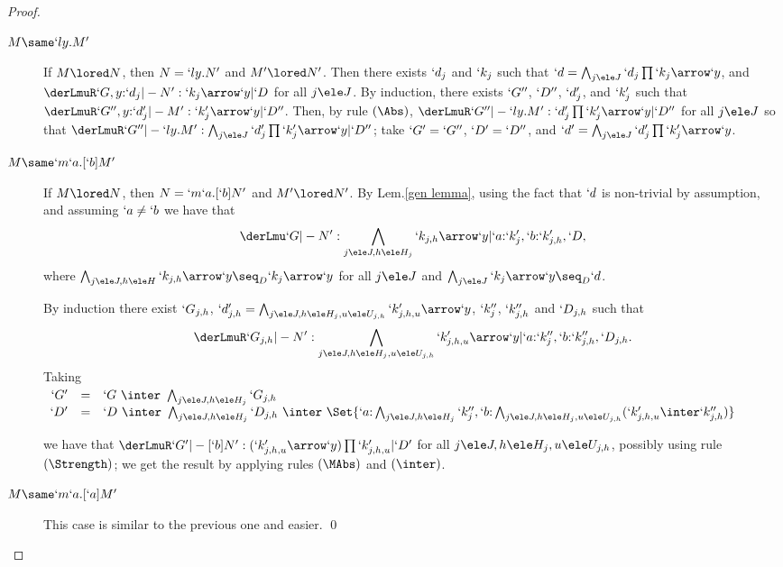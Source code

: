 \documentclass{lmcs}
\begin{document}
\begin{proof}
\begin{description}
 \item [$ M \same `ly.M' $] 
If $M \lored N$, then $N = `ly.N'$ and $M' \lored N'$.
Then there exists $`d_j$ and $`k_j$ such that $`d = \bigwedge_{j\ele J} `d_j\prod `k_j\arrow `y$, and $\derLmuR `G,y{:}`d_j |- N' : `k_j\arrow `y | `D $ for all $j\ele J$.
By induction, there exists $`G''$, $`D''$, $`d'_j$, and $`k'_j$ such that $\derLmuR `G'',y{:}`d'_j |- M' : `k'_j\arrow `y | `D'' $.
Then, by rule $(\Abs)$, $\derLmuR `G'' |- `ly.M' : `d'_j\prod `k'_j\arrow `y | `D'' $ for all $j\ele J$ so that $\derLmuR `G'' |- `ly.M' : \bigwedge_{j\ele J}`d'_j\prod `k'_j\arrow `y | `D'' $;  take $`G' = `G''$, $`D' = `D''$, and $`d' = \bigwedge_{j\ele J}`d'_j\prod `k'_j\arrow `y$.


 \item [{$M \same `m`a.[`b]M'$}]
 If $M \lored N$, then $N = `m`a.[`b]N'$ and $M' \lored N'$. By Lem.\skp\ref{gen lemma}, using the fact that $`d$ is non-trivial by assumption, and assuming $`a\neq`b$ we have that 
 \[
\derLmu `G |- N' : \bigwedge_{j\ele J, h\ele H_j}`k_{j,h}\arrow `y | `a{:}`k'_j, `b{:}`k'_{j,h},`D ,
 \]
where $ \bigwedge_{j\ele J, h\ele H} `k_{j,h}\arrow `y \seq_D `k_j\arrow`y$ for all $j\ele J$ and $\bigwedge _{j\ele J}`k_j\arrow`y \seq_D `d$.
 
By induction there exist $`G_{j,h}$, $`d'_{j,h} = \bigwedge_{j\ele J, h\ele H_j, u\ele U_{j,h}} `k'_{j,h,u}\arrow`y$, $`k''_j$, $`k''_{j,h}$ and $`D_{j,h}$ such that 
 \[
\derLmuR `G_{j,h} |- N' : {\bigwedge_{j\ele J, h\ele H_j, u\ele U_{j,h}} `k'_{j,h,u}\arrow`y} | `a{:}`k''_j, `b{:}`k''_{j,h},`D_{j,h} .
 \] 
Taking
 $ \begin{array}[t]{rcl}
`G' &=&`G \ \inter \ \bigwedge_{j\ele J, h\ele H_j}`G_{j,h} \\
`D' &=& `D \ \inter \ \bigwedge_{j\ele J, h\ele H_j}`D_{j,h} %
\ \inter \ \Set{`a{:} \bigwedge_{j\ele J, h\ele H_j}`k''_j, `b{:} \bigwedge_{j\ele J, h\ele H_j, u\ele U_{j,h}}(`k'_{j,h,u} \inter`k''_{j,h})}
 \end{array} $

\noindent
we have that $\derLmuR `G' |- {[`b]N'} : (`k'_{j,h,u}\arrow`y)\prod `k'_{j,h,u} | `D' $ for all $j\ele J, h\ele H_j, u\ele U_{j,h}$, possibly using rule $(\Strength)$; we get the result by applying rules $(\MAbs)$ and $(\inter)$.
	
 \item [{$M \same `m`a.[`a]M'$}]
This case is similar to the previous one and easier. \qed
	
 \end{description}
 \end{proof}
\end{document}
